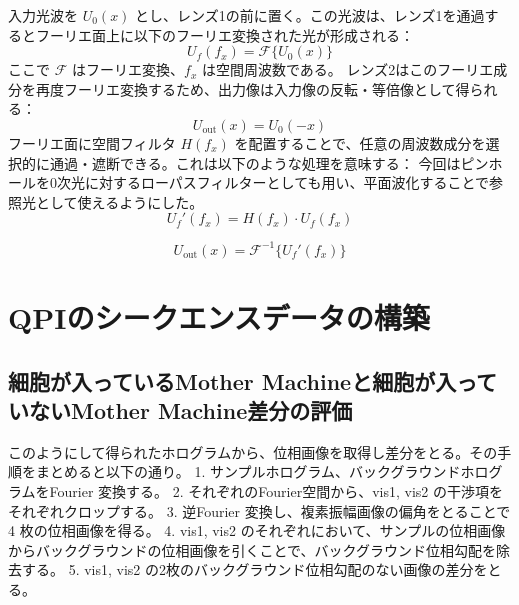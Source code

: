 入力光波を $U_0(x)$ とし、レンズ1の前に置く。この光波は、レンズ1を通過するとフーリエ面上に以下のフーリエ変換された光が形成される：
\begin{equation}
U_f(f_x) = \mathcal{F}\{ U_0(x) \}
\end{equation}
ここで $\mathcal{F}$ はフーリエ変換、$f_x$ は空間周波数である。
レンズ2はこのフーリエ成分を再度フーリエ変換するため、出力像は入力像の反転・等倍像として得られる：
\begin{equation}
U_{\text{out}}(x) = U_0(-x)
\end{equation}
フーリエ面に空間フィルタ $H(f_x)$ を配置することで、任意の周波数成分を選択的に通過・遮断できる。これは以下のような処理を意味する：
今回はピンホールを0次光に対するローパスフィルターとしても用い、平面波化することで参照光として使えるようにした。
\begin{equation}
U_f'(f_x) = H(f_x) \cdot U_f(f_x)
\end{equation}

\begin{equation}
U_{\text{out}}(x) = \mathcal{F}^{-1} \{ U_f'(f_x) \}
\end{equation}

\section{QPIのシークエンスデータの構築}
\subsection{細胞が入っているMother Machineと細胞が入っていないMother Machine差分の評価}
このようにして得られたホログラムから、位相画像を取得し差分をとる。その手順をまとめると以下の通り。
1. サンプルホログラム、バックグラウンドホログラムをFourier 変換する。
2. それぞれのFourier空間から、vis1, vis2 の干渉項をそれぞれクロップする。
3. 逆Fourier 変換し、複素振幅画像の偏角をとることで4 枚の位相画像を得る。
4. vis1, vis2 のそれぞれにおいて、サンプルの位相画像からバックグラウンドの位相画像を引くことで、バックグラウンド位相勾配を除去する。
5. vis1, vis2 の2枚のバックグラウンド位相勾配のない画像の差分をとる。